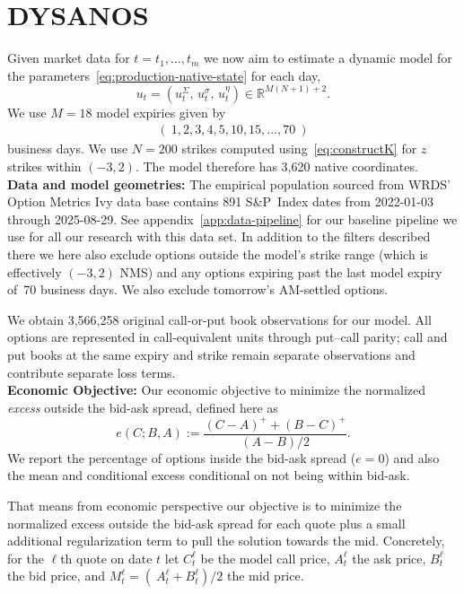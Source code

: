 \documentclass[11pt,a4paper]{article}
\newcommand{\R}{\mathbb{R}}
\begin{document}
\section{DYSANOS}
\label{sec:data}

Given market data for $t=t_1,\ldots,t_m$ we now aim to estimate a dynamic model
for the parameters~\eqref{eq:production-native-state} for each day,
\begin{equation}
  u_t=\left(
u_t^{\Sigma},\,
            u_t^{\sigma},\,
      u_t^{\eta}
      \right)
  \in\R^{M(N+1)+2}.
\end{equation}
We use $M=18$ model expiries given by
\begin{align*}
    (\ 1,2,3,4,5,10,15,\ldots,70\ ) 
\end{align*}
business days.
We use $N=200$ strikes computed using~\eqref{eq:constructK} for $z$ strikes within $(-3,2)$.
The model therefore has 3,620 native
coordinates.  \\

\noindent
\textbf{Data and model geometries:}
The empirical population sourced from WRDS' Option Metrics Ivy data base contains 891 S\&P~Index dates from 2022-01-03 through
2025-08-29. See appendix~\ref{app:data-pipeline} for our baseline pipeline we use for all our research with this data set.
In addition to the filters described there we here also exclude options outside the model's strike range (which is effectively $(-3,2)$ NMS) and any options expiring
past the last model expiry of~70 business days. We also exclude tomorrow's AM-settled options. 

We obtain 3,566,258 original call-or-put book observations for our model.
All options are represented in call-equivalent units through put–call parity; call and put books at the
same expiry and strike remain separate observations and contribute separate loss terms.\\

\noindent
\textbf{Economic Objective:}
Our economic objective to minimize the normalized \emph{excess} outside the bid-ask spread, defined here as
\begin{equation}
  e(C;B,A)
  :=\frac{(C-A)^+ +(B-C)^+}{(A-B)/2}.
  \label{eq:half-spread-excess-preview}
\end{equation}
We report the percentage of options inside the bid-ask spread ($e=0$) and also the mean and conditional excess conditional
on not being within bid-ask.

That means from economic perspective our objective is to minimize the normalized excess outside the bid-ask spread for each quote plus a small
additional regularization term to pull the solution towards the mid. Concretely,
for the $\ell$th quote on date $t$ let $C_t^\ell$ be the model call price, $A^\ell_t$ the ask price, $B^\ell_t$ the bid price, and
$M_t^\ell=(\ A_t^\ell+ B_t^\ell)/2$ the mid price.
\end{document}
